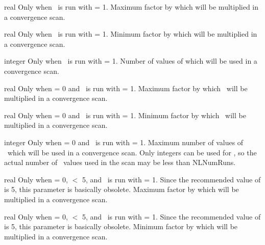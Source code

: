 \myhrule

{real}
{Only when \sfincsScan~is run with  = 1.}
{Maximum factor by which  will be multiplied in a convergence scan.}

\myhrule

{real}
{Only when \sfincsScan~is run with  = 1.}
{Minimum factor by which  will be multiplied in a convergence scan.}

\myhrule

{integer}
{Only when \sfincsScan~is run with  = 1.}
{Number of values of  which will be used in a convergence scan.}

\myhrule

{real}
{Only when  = 0 and \sfincsScan~is run with  = 1.}
{Maximum factor by which \NL~will be multiplied in a convergence scan.}

\myhrule

{real}
{Only when  = 0 and \sfincsScan~is run with  = 1.}
{Minimum factor by which \NL~will be multiplied in a convergence scan.}

\myhrule

{integer}
{Only when  = 0 and \sfincsScan~is run with  = 1.}
{Maximum number of values of \NL~which will be used in a convergence scan.  Only integers can be used
for \NL, so the actual number of \NL~values used in the scan may be less than {\ttfamily NLNumRuns}.}

\myhrule

{real}
{Only when  = 0,  $<$ 5, and \sfincsScan~is run with  = 1.
Since the recommended value of  is 5, this parameter is basically obsolete.}
{Maximum factor by which  will be multiplied in a convergence scan.}

\myhrule

{real}
{Only when  = 0,  $<$ 5, and \sfincsScan~is run with  = 1.
Since the recommended value of  is 5, this parameter is basically obsolete.}
{Minimum factor by which  will be multiplied in a convergence scan.}

